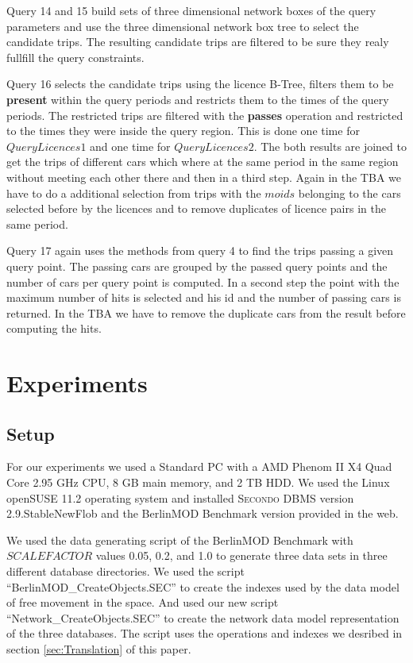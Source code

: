 \documentclass[a4paper]{article}
\newcommand{\secondo}{\textsc{Secondo}}
\newcommand{\bmodb} {BerlinMOD Benchmark}
\newcommand{\op}[1]{\textbf{#1}}
\newcommand{\secver}{2.9.StableNewFlob}
\begin{document}
Query 14 and 15 build sets of three dimensional network boxes of the query parameters
and use the three dimensional network box tree to select the candidate trips. The
resulting candidate trips are filtered to be sure they realy fullfill the query
constraints.

Query 16 selects the candidate trips using the licence B-Tree, filters them to be
\op{present} within the query periods and restricts them to the times of the
query periods. The restricted trips are filtered with the \op{passes} operation
and restricted to the times they were inside the query region. This is done one time
for $QueryLicences1$ and one time for $QueryLicences2$. The both results are joined
to get the trips of different cars which where at the same period in the same region
without meeting each other there and then in a third step. Again in the TBA we have
to do a additional selection from trips with the $moids$ belonging to the cars
selected before by the licences and to remove duplicates of licence pairs in the
same period.

Query 17 again uses the methods from query 4 to find the trips passing a given query
point. The passing cars are grouped by the passed query points and the number of
cars per query point is computed. In a second step the point with the maximum number
of hits is selected and his id and the number of passing cars is returned. In the
TBA we have to remove the duplicate cars from the result before computing the hits.
\section{Experiments}
\subsection{Setup}
\label{sec:scenario}
For our experiments we used a Standard PC with a AMD Phenom II X4 Quad Core 2.95 GHz CPU,
8 GB main memory, and 2 TB HDD. We used the Linux openSUSE 11.2 operating system and
installed \secondo{} DBMS version \secver{} and the \bmodb{} version provided in the web.

We used the data generating script of the \bmodb{} with $SCALEFACTOR$ values
0.05, 0.2, and 1.0 to generate three data sets in three different database directories.
We used the script ``BerlinMOD\_CreateObjects.SEC'' to create the indexes used by
the data model of free movement in the space. And used our new script
``Network_CreateObjects.SEC'' to create the network data model representation of
the three databases. The script uses the operations and indexes we desribed in
section \ref{sec:Translation} of this paper.
\end{document}
